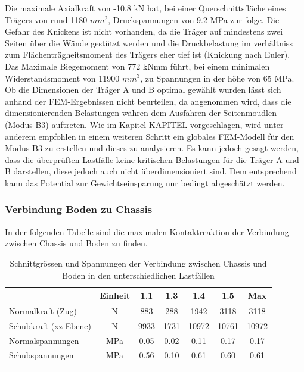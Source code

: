 Die maximale Axialkraft von -10.8 kN hat, bei einer Querschnittsfläche eines Trägers von rund 1180 $mm^2$, Druckspannungen von 9.2 MPa zur folge. Die Gefahr des Knickens ist nicht vorhanden, da die Träger auf mindestens zwei Seiten über die Wände gestützt werden und die Druckbelastung im verhältniss zum Flächenträgheitsmoment des Trägers eher tief ist (Knickung nach Euler). Das Maximale Biegemoment von 772 kNmm führt, bei einem minimalen Widerstandsmoment von 11900 $mm^3$, zu Spannungen in der höhe von 65 MPa.\\
Ob die Dimensionen der Träger A und B optimal gewählt wurden lässt sich anhand der FEM-Ergebnissen nicht beurteilen, da angenommen wird, dass die dimensionierenden Belastungen währen dem Ausfahren der Seitenmoudlen (Modus B3) auftreten. Wie im Kapitel KAPITEL vorgeschlagen, wird unter anderem empfohlen in einem weiteren Schritt ein globales FEM-Modell für den Modus B3 zu erstellen und dieses zu analysieren. Es kann jedoch gesagt werden, dass die überprüften Lastfälle keine kritischen Belastungen für die Träger A und B darstellen, diese jedoch auch nicht überdimensioniert sind. Dem entsprechend kann das Potential zur Gewichtseinsparung nur bedingt abgeschätzt werden.

\subsubsection{Verbindung Boden zu Chassis}
In der folgenden Tabelle sind die maximalen Kontaktreaktion der Verbindung zwischen Chassis und Boden zu finden.

\begin{table}[H]
\centering
\begin{tabular}{lcccccc}
\thickhline
	&	Einheit	&	1.1	&	1.3	&	1.4	&	1.5	&	Max	\\	\hline
Normalkraft (Zug)	&	N	&	883	&	288	&	1942	&	3118	&	3118	\\
Schubkraft (xz-Ebene)	&	N	&	9933	&	1731	&	10972	&	10761	&	10972	\\	\hline
Normalspannungen	&	MPa	&	0.05	&	0.02	&	0.11	&	0.17	&	0.17	\\
Schubspannungen	&	MPa	&	0.56	&	0.10	&	0.61	&	0.60	&	0.61	\\	\thickhline
\end{tabular}
\caption{Schnittgrössen und Spannungen der Verbindung zwischen Chassis und Boden in den unterschiedlichen Lastfällen}
\label{tab:FEMres Boden}
\end{table}



